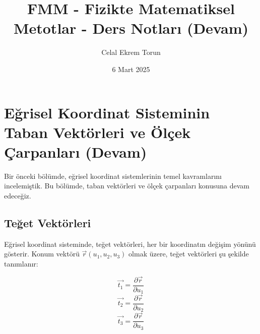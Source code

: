 \documentclass[11pt,letterpaper,twocolumn]{fenbil}
\title{FMM - Fizikte Matematiksel Metotlar - Ders Notları (Devam)}
\author{Celal Ekrem Torun}
\date{6 Mart 2025}
\begin{document}

\section{Eğrisel Koordinat Sisteminin Taban Vektörleri ve Ölçek Çarpanları (Devam)}

Bir önceki bölümde, eğrisel koordinat sistemlerinin temel kavramlarını incelemiştik. Bu bölümde, taban vektörleri ve ölçek çarpanları konusuna devam edeceğiz.

\subsection{Teğet Vektörleri}

Eğrisel koordinat sisteminde, teğet vektörleri, her bir koordinatın değişim yönünü gösterir. Konum vektörü $\vec{r}(u_1, u_2, u_3)$ olmak üzere, teğet vektörleri şu şekilde tanımlanır:

\begin{equation}
\vec{t_1} = \frac{\partial \vec{r}}{\partial u_1}
\end{equation}
\begin{equation}
\vec{t_2} = \frac{\partial \vec{r}}{\partial u_2}
\end{equation}
\begin{equation}
\vec{t_3} = \frac{\partial \vec{r}}{\partial u_3}
\end{equation}
\end{document}
